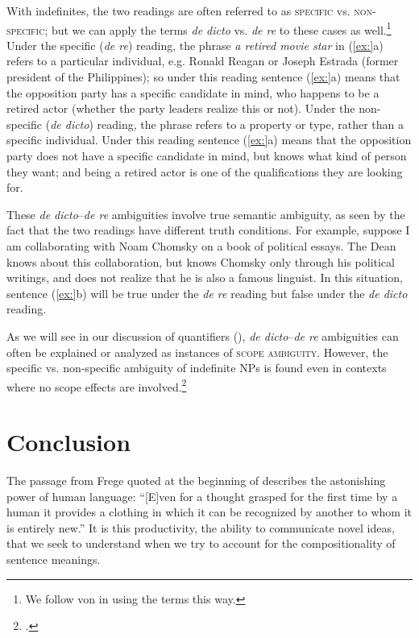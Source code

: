 With indefinites, the two readings are often referred to as \textsc{specific} vs. \textsc{non-specific}; but we can apply the terms \textit{de dicto} vs. \textit{de re} to these cases as well.\footnote{We follow von \citet{Heusinger2011} in using the terms this way.} Under the specific (\textit{de re}) reading, the phrase \textit{a retired movie star} in (\ref{ex:}a) refers to a particular individual, e.g. Ronald Reagan or Joseph Estrada (former president of the Philippines); so under this reading sentence (\ref{ex:}a) means that the opposition party has a specific candidate in mind, who happens to be a retired actor (whether the party leaders realize this or not). Under the non-specific (\textit{de dicto}) reading, the phrase refers to a property or type, rather than a specific individual. Under this reading sentence (\ref{ex:}a) means that the opposition party does not have a specific candidate in mind, but knows what kind of person they want; and being a retired actor is one of the qualifications they are looking for.



These \textit{de dicto}–\textit{de re} ambiguities involve true semantic ambiguity, as seen by the fact that the two readings have different truth conditions. For example, suppose I am collaborating with Noam Chomsky on a book of political essays. The Dean knows about this collaboration, but knows Chomsky only through his political writings, and does not realize that he is also a famous linguist. In this situation, sentence (\ref{ex:}b) will be true under the \textit{de re} reading but false under the \textit{de dicto} reading.



As we will see in our discussion of quantifiers (), \textit{de dicto}–\textit{de re} ambiguities can often be explained or analyzed as instances of \textsc{scope ambiguity}. However, the specific vs. non-specific ambiguity of indefinite NPs is found even in contexts where no scope effects are involved.\footnote{\citet{FodorSag1982}.}


\section{Conclusion}\label{sec:} %

The passage from Frege quoted at the beginning of  describes the astonishing power of human language: “[E]ven for a thought grasped for the first time by a human it provides a clothing in which it can be recognized by another to whom it is entirely new.” It is this productivity, the ability to communicate novel ideas, that we seek to understand when we try to account for the compositionality of sentence meanings.



